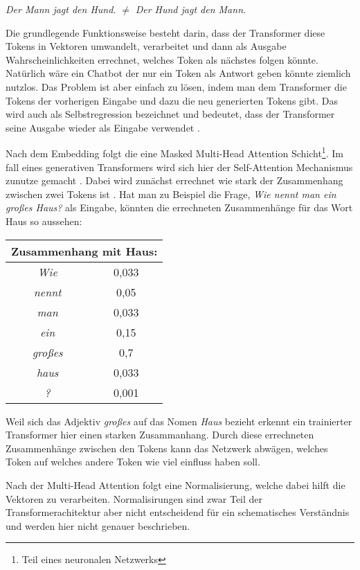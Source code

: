 	\emph{Der Mann jagt den Hund.} 	
	\space $\neq$ \space
	\emph{Der Hund jagt den Mann.}
	
	\clearpage
	Die grundlegende Funktionsweise besteht darin, dass der Transformer diese Tokens in Vektoren umwandelt, verarbeitet und dann 
	als Ausgabe Wahrscheinlichkeiten errechnet, welches Token als nächstes folgen könnte. Natürlich wäre ein Chatbot der nur
	ein Token als Antwort geben könnte ziemlich nutzlos. Das Problem ist aber einfach zu lösen, indem man dem Transformer
	die Tokens der vorherigen Eingabe und dazu die neu generierten Tokens gibt. Das wird auch als Selbstregression bezeichnet und 
	bedeutet, dass der Transformer seine Ausgabe wieder als Eingabe verwendet \cite[S. 2]{vaswani2017}.  

	Nach dem Embedding folgt die eine Masked Multi-Head Attention Schicht\footnote{Teil eines neuronalen Netzwerks}.
	Im fall eines generativen Transformers wird sich hier der  Self-Attention Mechanismus zunutze gemacht \cite[S. 2f]{turner2024}. 
	Dabei wird zunächst errechnet wie stark der Zusammenhang zwischen zwei Tokens ist \cite[S. 4]{vaswani2017}. Hat man zu 
	Beispiel die Frage, \emph{Wie nennt man ein großes Haus?} als Eingabe, könnten die errechneten Zusammenhänge für das 
	Wort Haus so aussehen: 
	
	\vspace{5mm}
	\begin{tabular}{ |c|c| }
  		\hline
	  	\multicolumn{2}{|c|}{Zusammenhang mit Haus: } \\
	  	\hline
	  	\emph{Wie} & 0,033 \\
	  	\hline
	  	\emph{nennt} & 0,05 \\
		\hline
	  	\emph{man} & 0,033 \\
	  	\hline
		\emph{ein} & 0,15 \\
	  	\hline
		\emph{großes} & 0,7 \\
	  	\hline
		\emph{haus} & 0,033 \\
		\hline
		\emph{?} & 0,001 \\
		\hline
	\end{tabular}
	\vspace{5mm}
	
	\noindent Weil sich das Adjektiv \emph{großes} auf das Nomen \emph{Haus} bezieht erkennt ein trainierter Transformer hier
	einen starken Zusammanhang. Durch diese errechneten Zusammenhänge zwischen den Tokens kann das Netzwerk abwägen, welches
	Token auf welches andere Token wie viel einfluss haben soll.	
	
	Nach der Multi-Head Attention folgt eine Normalisierung, welche dabei hilft die Vektoren zu verarbeiten. 
	Normalisirungen sind zwar Teil der Transformerachitektur aber nicht entscheidend für ein schematisches Verständnis
	und werden hier nicht genauer beschrieben\cite[S.3]{vaswani2017}. 

